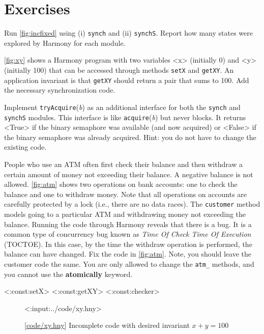 \documentclass{report}
\newcommand{\harmonylink}[1]{%
[\href{https://harmony.cs.cornell.edu/#1}{\underline{#1}}]%
}
\newenvironment{code}{
\tcolorbox
}{
\endtcolorbox
}
\begin{document}
\section*{Exercises}
\begin{problems}
\item
Run \autoref{fig:incfixed} using (i) \texttt{synch} and (ii) \texttt{synchS}.
Report how many states were explored by Harmony for each module.
\item \label{ex:xy} \autoref{fig:xy} shows a Harmony program with two variables <{x}>
(initially 0) and <{y}> (initially 100) that can be accessed through methods
\texttt{setX} and \texttt{getXY}.  An application invariant is that \texttt{getXY}
should return a pair that sums to 100.  Add the necessary synchronization code.
\item \label{ex:trylock} Implement \texttt{tryAcquire}(\textit{b}) as an additional
interface for both the \texttt{synch} and \texttt{synchS} modules.
This interface is like \texttt{acquire}(\textit{b}) but never blocks.  It
returns <{True}> if the binary semaphore was available (and now acquired) or <{False}>
if the binary semaphore was already acquired.
Hint: you do not have to change the existing code.
\item People who use an ATM often first check their balance and then withdraw
a certain amount of money not exceeding their balance.  A negative balance
is not allowed.  \autoref{fig:atm} shows two operations on bank accounts:
one to check the balance and one to withdraw money.
Note that all operations on accounts are carefully protected by a lock
(i.e., there are no data races).
The \texttt{customer}
method models going to a particular ATM and withdrawing money not exceeding
the balance.
Running the code through Harmony reveals that there is a bug.
It is a common type of concurrency bug known as \emph{Time Of Check Time Of
Execution} (TOCTOE).
In this case, by the time the withdraw operation is performed,
the balance can have changed.
Fix the code in \autoref{fig:atm}.  Note, you should leave the
customer code the same. You are only allowed to change the
\texttt{atm\_} methods, and you cannot use the \textbf{atomically}
keyword.
\end{problems}

<{:const:setX}>
<{:const:getXY}>
<{:const:checker}>

\begin{figure}
\begin{code}
<{:input:../code/xy.hny}>
\end{code}
\caption{\harmonylink{code/xy.hny} Incomplete code with desired invariant $x + y = 100$}
\label{fig:xy}
\end{figure}
\end{document}
